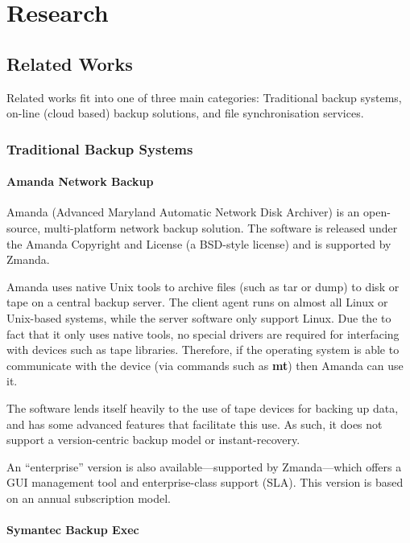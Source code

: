 \section{Research}

\subsection{Related Works}

Related works fit into one of three main categories: Traditional backup
systems, on-line (cloud based) backup solutions, and file synchronisation
services.

\subsubsection{Traditional Backup Systems}

\paragraph{Amanda Network Backup}

Amanda (Advanced Maryland Automatic Network Disk Archiver) is an open-source,
multi-platform network backup solution. The software is released under the
Amanda Copyright and License (a BSD-style license) and is supported by Zmanda.

Amanda uses native Unix tools to archive files (such as tar or dump) to disk or
tape on a central backup server. The client agent runs on almost all Linux or
Unix-based systems, while the server software only support Linux. Due the to
fact that it only uses native tools, no special drivers are required for
interfacing with devices such as tape libraries. Therefore, if the operating
system is able to communicate with the device (via commands such as
\textbf{mt}) then Amanda can use it.

The software lends itself heavily to the use of tape devices for backing up
data, and has some advanced features that facilitate this use. As such, it does
not support a version-centric backup model or instant-recovery.

An ``enterprise'' version is also available---supported by Zmanda---which
offers a GUI management tool and enterprise-class support (SLA).  This version
is based on an annual subscription model.

\paragraph{Symantec Backup Exec}


